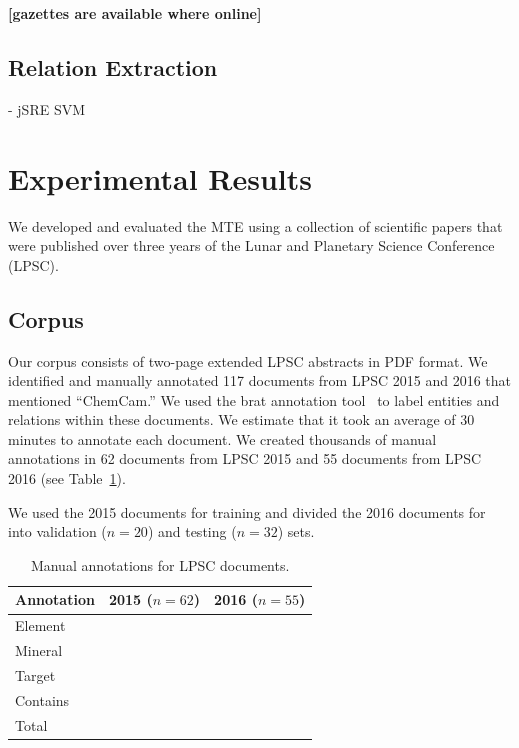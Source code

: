 \documentclass[letterpaper]{article} %
\begin{document}
{\bf [gazettes are available where online]}

\subsection{Relation Extraction}

- jSRE SVM

\section{Experimental Results}

We developed and evaluated the MTE using a collection of scientific
papers that were published over three years of the Lunar and Planetary
Science Conference (LPSC).

\subsection{Corpus}

Our corpus consists of two-page extended LPSC abstracts in PDF format.
We identified and manually annotated 117 documents from LPSC 2015 and
2016 that mentioned ``ChemCam.''  We used the brat annotation
tool~\cite{brat} to label entities and relations within these
documents.  We estimate that it took an average of 30 minutes to
annotate each document.  We created thousands of manual annotations in
62 documents from LPSC 2015 and 55 documents from LPSC 2016 (see
Table~\ref{tab:docs}).

We used the 2015 documents for training and divided the 2016 documents
for into validation ($n=20$) and testing ($n=32$) sets.

\begin{table}
\caption{Manual annotations for LPSC documents.}
\label{tab:docs}
\begin{center}
\begin{tabular}{l|ll}
Annotation & 2015 ($n=62$) & 2016 ($n=55$) \\ \hline
Element  & \\
Mineral  & \\
Target   & \\ \hline
Contains & \\ \hline
Total & \\
\hline
\end{tabular}
\end{center}
\end{table}
\end{document}

